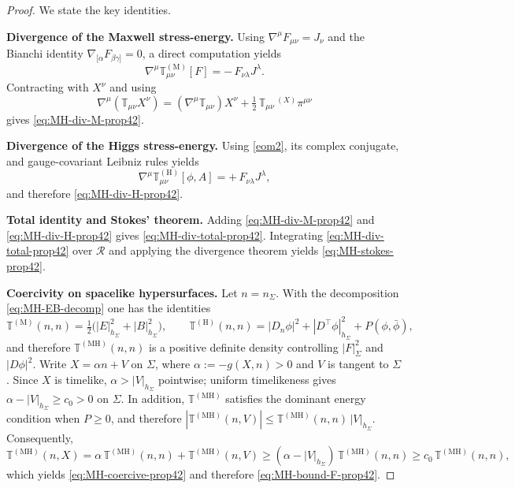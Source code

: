 \documentclass[11pt]{article}
\numberwithin{equation}{section}
\theoremstyle{plain}
\theoremstyle{definition}
\theoremstyle{remark}
\begin{document}
\begin{proof}
We state the key identities.

\smallskip
\noindent\textbf{Divergence of the Maxwell stress-energy.}
Using $\nabla^{\mu}F_{\mu\nu}=J_{\nu}$ and the Bianchi identity $\nabla_{[\alpha}F_{\beta\gamma]}=0$, a direct computation yields
\begin{equation}
\nabla^{\mu}\mathbb T^{(\mathrm M)}_{\mu\nu}[F]= -\,F_{\nu\lambda}J^{\lambda}.
\end{equation}
Contracting with $X^{\nu}$ and using
\begin{equation}
\nabla^{\mu}(\mathbb T_{\mu\nu}X^{\nu})
=
(\nabla^{\mu}\mathbb T_{\mu\nu})X^{\nu}+\tfrac12\,\mathbb T_{\mu\nu}\,{}^{(X)}\pi^{\mu\nu}
\end{equation}
gives \eqref{eq:MH-div-M-prop42}.

\smallskip
\noindent\textbf{Divergence of the Higgs stress-energy.}
Using \eqref{eom2}, its complex conjugate, and gauge-covariant Leibniz rules yields
\begin{equation}
\nabla^{\mu}\mathbb T^{(\mathrm H)}_{\mu\nu}[\phi,A]= +\,F_{\nu\lambda}J^{\lambda},
\end{equation}
and therefore \eqref{eq:MH-div-H-prop42}.

\smallskip
\noindent\textbf{Total identity and Stokes' theorem.}
Adding \eqref{eq:MH-div-M-prop42} and \eqref{eq:MH-div-H-prop42} gives \eqref{eq:MH-div-total-prop42}.
Integrating \eqref{eq:MH-div-total-prop42} over $\mathcal R$ and applying the divergence theorem yields \eqref{eq:MH-stokes-prop42}.

\smallskip
\noindent\textbf{Coercivity on spacelike hypersurfaces.}
Let $n=n_{\Sigma}$.
With the decomposition \eqref{eq:MH-EB-decomp} one has the identities
\begin{equation}
\mathbb T^{(\mathrm M)}(n,n)=\tfrac12\bigl(|E|^{2}_{h_{\Sigma}}+|B|^{2}_{h_{\Sigma}}\bigr),
\qquad
\mathbb T^{(\mathrm H)}(n,n)=|D_{n}\phi|^{2}+|D^{\top}\phi|^{2}_{h_{\Sigma}}+P(\phi,\bar\phi),
\end{equation}
and therefore $\mathbb T^{(\mathrm{MH})}(n,n)$ is a positive definite density controlling $|F|_{\Sigma}^{2}$ and $|D\phi|^{2}$.
Write $X=\alpha n+V$ on $\Sigma$, where $\alpha:=-g(X,n)>0$ and $V$ is tangent to $\Sigma$.
Since $X$ is timelike, $\alpha>|V|_{h_{\Sigma}}$ pointwise; uniform timelikeness gives $\alpha-|V|_{h_{\Sigma}}\ge c_{0}>0$ on $\Sigma$.
In addition, $\mathbb T^{(\mathrm{MH})}$ satisfies the dominant energy condition when $P\ge0$, and therefore
$|\mathbb T^{(\mathrm{MH})}(n,V)|\le \mathbb T^{(\mathrm{MH})}(n,n)\,|V|_{h_{\Sigma}}$.
Consequently,
\begin{equation}
\mathbb T^{(\mathrm{MH})}(n,X)
=
\alpha\,\mathbb T^{(\mathrm{MH})}(n,n)+\mathbb T^{(\mathrm{MH})}(n,V)
\ge
(\alpha-|V|_{h_{\Sigma}})\,\mathbb T^{(\mathrm{MH})}(n,n)
\ge
c_{0}\,\mathbb T^{(\mathrm{MH})}(n,n),
\end{equation}
which yields \eqref{eq:MH-coercive-prop42} and therefore \eqref{eq:MH-bound-F-prop42}.
\end{proof}
\end{document}
